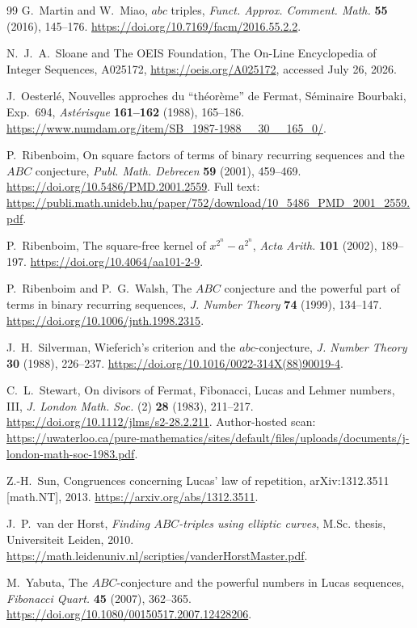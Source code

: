 \documentclass[11pt]{article}
\theoremstyle{remark}
\begin{document}
\begin{thebibliography}{99}
G.~Martin and W.~Miao,
\newblock \(abc\) triples,
\newblock \emph{Funct. Approx. Comment. Math.} \textbf{55} (2016),
145--176.
\newblock \url{https://doi.org/10.7169/facm/2016.55.2.2}.

N.~J.~A.~Sloane and The OEIS Foundation,
\newblock The On-Line Encyclopedia of Integer Sequences, A025172,
\newblock \url{https://oeis.org/A025172}, accessed July 26, 2026.

J.~Oesterl\'e,
\newblock Nouvelles approches du ``th\'eor\`eme'' de Fermat,
\newblock S\'eminaire Bourbaki, Exp.\ 694,
\emph{Ast\'erisque} \textbf{161--162} (1988), 165--186.
\newblock \url{https://www.numdam.org/item/SB_1987-1988__30__165_0/}.

P.~Ribenboim,
\newblock On square factors of terms of binary recurring sequences and
the \(ABC\) conjecture,
\newblock \emph{Publ. Math. Debrecen} \textbf{59} (2001), 459--469.
\newblock \url{https://doi.org/10.5486/PMD.2001.2559}.
\newblock Full text:
\url{https://publi.math.unideb.hu/paper/752/download/10_5486_PMD_2001_2559.pdf}.

P.~Ribenboim,
\newblock The square-free kernel of \(x^{2^n}-a^{2^n}\),
\newblock \emph{Acta Arith.} \textbf{101} (2002), 189--197.
\newblock \url{https://doi.org/10.4064/aa101-2-9}.

P.~Ribenboim and P.~G.~Walsh,
\newblock The \(ABC\) conjecture and the powerful part of terms in binary
recurring sequences,
\newblock \emph{J. Number Theory} \textbf{74} (1999), 134--147.
\newblock \url{https://doi.org/10.1006/jnth.1998.2315}.

J.~H.~Silverman,
\newblock Wieferich's criterion and the \(abc\)-conjecture,
\newblock \emph{J. Number Theory} \textbf{30} (1988), 226--237.
\newblock \url{https://doi.org/10.1016/0022-314X(88)90019-4}.

C.~L.~Stewart,
\newblock On divisors of Fermat, Fibonacci, Lucas and Lehmer numbers, III,
\newblock \emph{J. London Math. Soc.} (2) \textbf{28} (1983), 211--217.
\newblock \url{https://doi.org/10.1112/jlms/s2-28.2.211}.
\newblock Author-hosted scan:
\url{https://uwaterloo.ca/pure-mathematics/sites/default/files/uploads/documents/j-london-math-soc-1983.pdf}.

Z.-H.~Sun,
\newblock Congruences concerning Lucas' law of repetition,
\newblock arXiv:1312.3511 [math.NT], 2013.
\newblock \url{https://arxiv.org/abs/1312.3511}.

J.~P.~van der Horst,
\newblock \emph{Finding \(ABC\)-triples using elliptic curves},
\newblock M.Sc. thesis, Universiteit Leiden, 2010.
\newblock
\url{https://math.leidenuniv.nl/scripties/vanderHorstMaster.pdf}.

M.~Yabuta,
\newblock The \(ABC\)-conjecture and the powerful numbers in Lucas
sequences,
\newblock \emph{Fibonacci Quart.} \textbf{45} (2007), 362--365.
\newblock \url{https://doi.org/10.1080/00150517.2007.12428206}.

\end{thebibliography}
\end{document}
